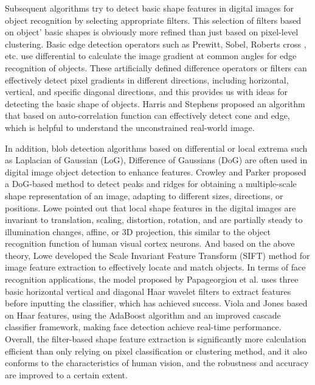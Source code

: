 \documentclass[10pt, a4paper]{IEEEtran} %
\begin{document}
	\par
	Subsequent algorithms try to detect basic shape features in digital images for object recognition by selecting appropriate filters. This selection of filters based on object’ basic shapes is obviously more refined than just based on pixel-level clustering. Basic edge detection operators such as Prewitt, Sobel, Roberts cross \cite{gonzales2002digital}, etc. use differential to calculate the image gradient at common angles for edge recognition of objects. These artificially defined difference operators or filters can effectively detect pixel gradients in different directions, including horizontal, vertical, and specific diagonal directions, and this provides us with ideas for detecting the basic shape of objects. Harris and Stephens \cite{harris1988combined} proposed an algorithm that based on auto-correlation function can effectively detect cone and edge, which is helpful to understand the unconstrained real-world image. 
	\par
	In addition, blob detection algorithms based on differential or local extrema such as Laplacian of Gaussian (LoG), Difference of Gaussians (DoG) are often used in digital image object detection to enhance features. Crowley and Parker \cite{crowley1984representation} proposed a DoG-based method to detect peaks and ridges for obtaining a multiple-scale shape representation of an image, adapting to different sizes, directions, or positions. Lowe \cite{lowe1999object} pointed out that local shape features in the digital images are invariant to translation, scaling, distortion, rotation, and are partially steady to illumination changes, affine, or 3D projection, this similar to the object recognition function of human visual cortex neurons. And based on the above theory, Lowe developed the Scale Invariant Feature Transform (SIFT) method for image feature extraction to effectively locate and match objects. In terms of face recognition applications, the model proposed by Papageorgiou et al. \cite{papageorgiou1998general} uses three basic horizontal vertical and diagonal Haar wavelet filters to extract features before inputting the classifier, which has achieved success. Viola and Jones \cite{viola2005detecting} based on Haar features, using the AdaBoost algorithm and an improved cascade classifier framework, making face detection achieve real-time performance. Overall, the filter-based shape feature extraction is significantly more calculation efficient than only relying on pixel classification or clustering method, and it also conforms to the characteristics of human vision, and the robustness and accuracy are improved to a certain extent.
\end{document}

